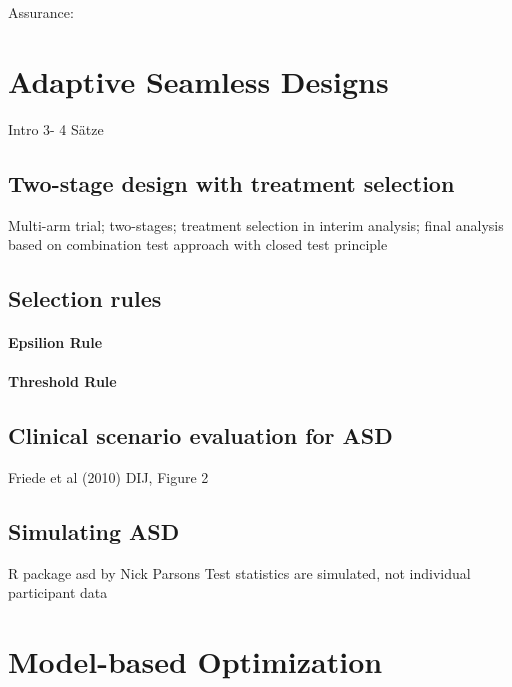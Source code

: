 \documentclass[bimj,fleqn]{w-art}
\theoremstyle{plain}
\theoremstyle{definition}
\begin{document}
\cite{barnes_integrating_2010}
\cite{donohue_oncedaily_2010}
\cite{cuffe_when_2014}

Assurance: \cite{stallard_optimal_2009}

\section{Adaptive Seamless Designs}
Intro 3- 4 Sätze

\subsection{Two-stage design with treatment selection}
Multi-arm trial; two-stages; treatment selection in interim analysis; final analysis based on combination test approach with closed test principle


\subsection{Selection rules}
\paragraph{Epsilion Rule}

\paragraph{Threshold Rule}

\subsection{Clinical scenario evaluation for ASD}
Friede et al (2010) DIJ, Figure 2

\subsection{Simulating ASD}
R package asd by Nick Parsons
Test statistics are simulated, not individual participant data

\section{Model-based Optimization}
\end{document}
